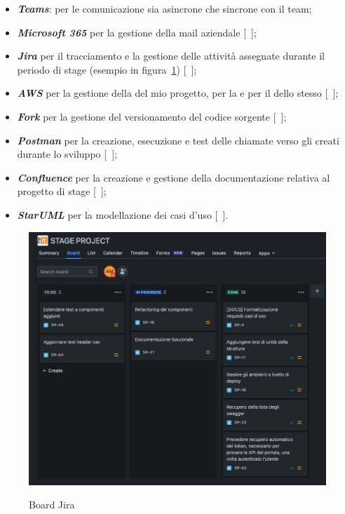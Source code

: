 \begin{itemize}
  \item \textbf{\textit{Teams}}: per le comunicazione sia asincrone che sincrone con il team;
  \item \textbf{\textit{Microsoft 365}} per la gestione della mail aziendale [~\cite{site:microsoft365}];
  \item \textbf{\textit{Jira}} per il tracciamento e la gestione delle attività assegnate durante il periodo di stage (esempio in figura~\ref{fig:board-jira}) [~\cite{site:jira}];
  \item \textbf{\textit{AWS}} per la gestione della  del mio progetto, per la  e per il  dello stesso [~\cite{site:aws}];
  \item \textbf{\textit{Fork}} per la gestione del versionamento del codice sorgente [~\cite{site:fork}];
  \item \textbf{\textit{Postman}} per la creazione, esecuzione e test delle chiamate verso gli  creati durante lo sviluppo [~\cite{site:postman}];
  \item \textbf{\textit{Confluence}} per la creazione e gestione della documentazione relativa al progetto di stage [~\cite{site:confluence}];
  \item \textbf{\textit{StarUML}} per la modellazione dei casi d'uso [~\cite{site:staruml}].
\end{itemize}

\begin{figure}[!ht] 
  \centering 
  \includegraphics[width=0.9\columnwidth, alt={Esempio di utilizzo della board di Jira}]{images/Board.jpg}
  \caption{Board Jira}\label{fig:board-jira}
\end{figure}

